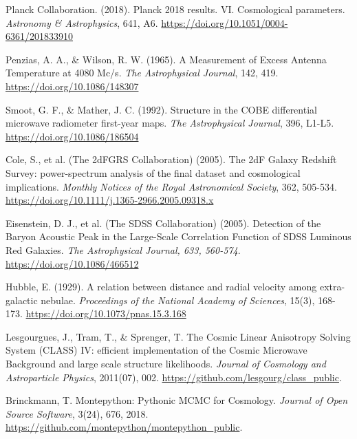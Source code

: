 
\begin{thebibliography}{999}
	 Planck Collaboration. (2018). Planck 2018 results. VI\@. Cosmological parameters. \textit{Astronomy \& Astrophysics}, 641, A6. \url{https://doi.org/10.1051/0004-6361/201833910}

	 Penzias, A. A., \& Wilson, R. W. (1965). A Measurement of Excess Antenna Temperature at 4080 Mc/s. \textit{The Astrophysical Journal}, 142, 419. \url{https://doi.org/10.1086/148307}

 Smoot, G. F., \& Mather, J. C. (1992). Structure in the COBE differential microwave radiometer first-year maps. \textit{The Astrophysical Journal}, 396, L1-L5. \url{https://doi.org/10.1086/186504}

 Cole, S., et al. (The 2dFGRS Collaboration) (2005). The 2dF Galaxy Redshift Survey: power-spectrum analysis of the final dataset and cosmological implications. \textit{Monthly Notices of the Royal Astronomical Society}, 362, 505-534. \url{https://doi.org/10.1111/j.1365-2966.2005.09318.x}

 Eisenstein, D. J., et al. (The SDSS Collaboration) (2005). Detection of the Baryon Acoustic Peak in the Large-Scale Correlation Function of SDSS Luminous Red Galaxies. \textit{The Astrophysical Journal, 633, 560-574}. \url{https://doi.org/10.1086/466512}

 Hubble, E. (1929). A relation between distance and radial velocity among extra-galactic nebulae. \textit{Proceedings of the National Academy of Sciences}, 15(3), 168-173. \url{https://doi.org/10.1073/pnas.15.3.168}

 Lesgourgues, J., Tram, T., \& Sprenger, T. The Cosmic Linear Anisotropy Solving System (CLASS) IV: efficient implementation of the Cosmic Microwave Background and large scale structure likelihoods. \textit{Journal of Cosmology and Astroparticle Physics}, 2011(07), 002. \url{https://github.com/lesgourg/class_public}.

 Brinckmann, T. Montepython: Pythonic MCMC for Cosmology. \textit{Journal of Open Source Software}, 3(24), 676, 2018. \url{https://github.com/montepython/montepython_public}.


\end{thebibliography}
